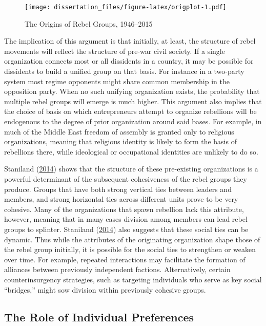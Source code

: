 \documentclass[12pt,]{book}
\theoremstyle{definition}
\theoremstyle{definition}
\theoremstyle{definition}
\theoremstyle{remark}
\begin{document}
\begin{figure}
\centering
\texttt{[image: dissertation\_files/figure-latex/origplot-1.pdf]}
\caption{\label{fig:origplot}The Origins of Rebel Groups, 1946--2015}
\end{figure}

The implication of this argument is that initially, at least, the
structure of rebel movements will reflect the structure of pre-war civil
society. If a single organization connects most or all dissidents in a
country, it may be possible for dissidents to build a unified group on
that basis. For instance in a two-party system most regime opponents
might share common membership in the opposition party. When no such
unifying organization exists, the probability that multiple rebel groups
will emerge is much higher. This argument also implies that the choice
of basis on which entrepreneurs attempt to organize rebellions will be
endogenous to the degree of prior organization around said bases. For
example, in much of the Middle East freedom of assembly is granted only
to religious organizations, meaning that religious identity is likely to
form the basis of rebellions there, while ideological or occupational
identities are unlikely to do so.

Staniland (\protect\hyperlink{ref-Staniland2014}{2014}) shows that the
structure of these pre-existing organizations is a powerful determinant
of the subsequent cohesiveness of the rebel groups they produce. Groups
that have both strong vertical ties between leaders and members, and
strong horizontal ties across different units prove to be very cohesive.
Many of the organizations that spawn rebellion lack this attribute,
however, meaning that in many cases division among members can lead
rebel groups to splinter. Staniland
(\protect\hyperlink{ref-Staniland2014}{2014}) also suggests that these
social ties can be dynamic. Thus while the attributes of the originating
organization shape those of the rebel group initially, it is possible
for the social ties to strengthen or weaken over time. For example,
repeated interactions may facilitate the formation of alliances between
previously independent factions. Alternatively, certain
counterinsurgency strategies, such as targeting individuals who serve as
key social ``bridges,'' might sow division within previously cohesive
groups.

\hypertarget{the-role-of-individual-preferences}{%
\subsection{The Role of Individual
Preferences}\label{the-role-of-individual-preferences}}
\end{document}
